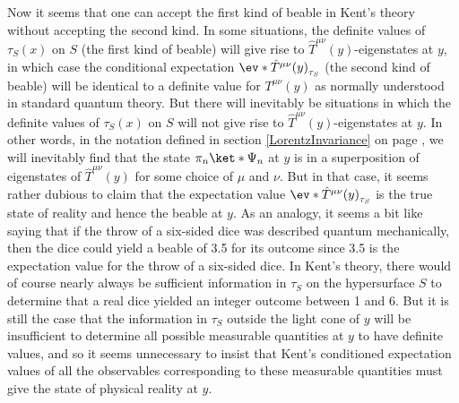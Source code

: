 \documentclass[12pt]{report}
\begin{document}
Now it seems that one can accept the first kind of beable in Kent's theory without accepting the second kind. In some situations, the definite values of $\tau_S(x)$ on $S$ (the first kind of beable) will give rise to $\hat{T}^{\mu\nu}(y)$-eigenstates at $y$, in which case the conditional expectation $\ev*{\hat{T}^{\mu\nu}(y)}_{\tau_S}$ (the second kind of beable) will be identical to a definite value for $T^{\mu\nu}(y)$ as normally understood in standard quantum theory. But there will inevitably be situations in which the definite values of $\tau_S(x)$ on $S$ will not give rise to  $\hat{T}^{\mu\nu}(y)$-eigenstates at $y$. In other words, in the notation defined in section \ref{LorentzInvariance} on page \pageref{tauprojection}, we will inevitably find that the state $\pi_n\ket*{\Psi_n}$ at $y$ is in a superposition of eigenstates of $\hat{T}^{\mu\nu}(y)$ for some choice of $\mu$ and $\nu$. But in that case, it seems rather dubious to claim that the expectation value $\ev*{\hat{T}^{\mu\nu}(y)}_{\tau_S}$ is the true state of reality and hence the beable at $y$. As an analogy, it seems a bit like saying that if the throw of a six-sided dice was described quantum mechanically, then the dice could yield a beable of 3.5 for its outcome since 3.5 is the expectation value for the throw of a six-sided dice. In Kent's theory, there would of course nearly always be sufficient information in $\tau_S$ on the hypersurface $S$  to determine that a real dice yielded an integer outcome between 1 and 6.  But it is still the case that the information in $\tau_S$ outside the light cone of $y$ will be insufficient to determine all possible measurable quantities at $y$ to have definite values, and so it seems unnecessary to insist that Kent's conditioned expectation values of all the observables corresponding to these measurable quantities must give the state of physical reality at $y$. 
\end{document}
